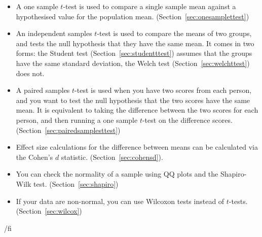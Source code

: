 \begin{itemize} \itemsep -2pt
\item A one sample $t$-test is used to compare a single sample mean against a hypothesised value for the population mean. (Section~\ref{sec:onesamplettest})
\item An independent samples $t$-test is used to compare the means of two groups, and tests the null hypothesis that they have the same mean. It comes in two forms: the Student test (Section~\ref{sec:studentttest}) assumes that the groups have the same standard deviation, the Welch test (Section~\ref{sec:welchttest}) does not.
\item A paired samples $t$-test is used when you have two scores from each person, and you want to test the null hypothesis that the two scores have the same mean. It is equivalent to taking the difference between the two scores for each person, and then running a one sample $t$-test on the difference scores. (Section~\ref{sec:pairedsamplesttest})
\item Effect size calculations for the difference between means can be calculated via the Cohen's $d$ statistic. (Section~\ref{sec:cohensd}).
\item You can check the normality of a sample using QQ plots and the Shapiro-Wilk test. (Section~\ref{sec:shapiro})
\item If your data are non-normal, you can use Wilcoxon tests instead of $t$-tests. (Section~\ref{sec:wilcox})
\end{itemize}



/fi %



